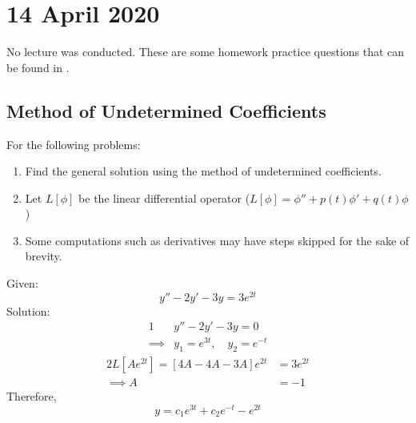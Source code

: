 \documentclass[diffeq.tex]{subfiles}
\begin{document}
\chapter{14 April 2020}
No lecture was conducted. These are some homework practice questions that can be found in \textbook.

\section{Method of Undetermined Coefficients}
For the following problems:
\begin{enumerate}
    \item Find the general solution using the method of undetermined coefficients.
    \item Let $L[\phi]$ be the linear differential operator ($L[\phi] = \phi'' + p(t)\phi' + q(t)\phi$)
    \item Some computations such as derivatives may have steps skipped for the sake of brevity.
\end{enumerate}
\begin{homework*}[141.1]
    Given:
    \begin{equation}
        y'' - 2y' - 3y = 3e^{2t}
    \end{equation}
    Solution:
    \begin{alignat}{1}
        &y'' - 2y' - 3y = 0\\
        \implies& y_{1} = e^{3t},\quad y_{2} = e^{-t}
    \end{alignat}
    \begin{alignat}{2}
        L[Ae^{2t}] = \left[4A - 4A - 3A\right] e^{2t} &= 3e^{2t}\\
        \implies A &= -1
    \end{alignat}
    Therefore,
    \begin{equation}
        y = c_{1}e^{3t} + c_{2}e^{-t} - e^{2t}
    \end{equation}
\end{homework*}
\np
\end{document}
